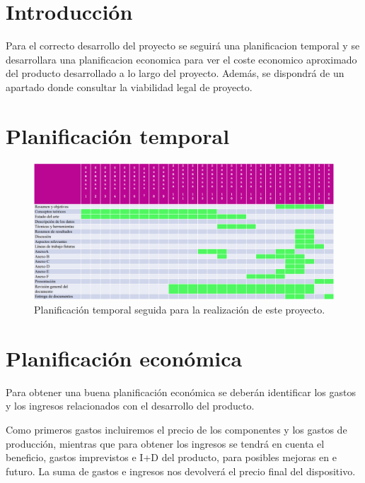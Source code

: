 
\section{Introducción}
Para el correcto desarrollo del proyecto se seguirá una planificacion temporal y se desarrollara una planificacion economica para ver el coste economico aproximado del producto desarrollado a lo largo del proyecto. Además, se dispondrá de un apartado donde consultar la viabilidad legal de proyecto.

\section{Planificación temporal}
\begin{figure}[h]
    \centering
    \includegraphics[width=1\textwidth]{img/PlanificacionTemporal.png}
    \caption{Planificación temporal seguida para la realización de este proyecto.}
    \label{fig:planTemporal} %
\end{figure}

\section{Planificación económica}
Para obtener una buena planificación económica se deberán identificar los gastos y los ingresos relacionados con el desarrollo del producto.

Como primeros gastos incluiremos el precio de los componentes y los gastos de producción, mientras que para obtener los ingresos se tendrá en cuenta el beneficio, gastos imprevistos e I+D del producto, para posibles mejoras en e futuro. La suma de gastos e ingresos nos devolverá el precio final del dispositivo.


